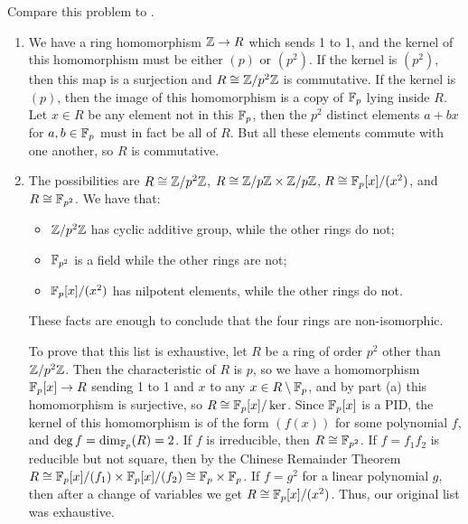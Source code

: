 \begin{solution}
Compare this problem to .
\begin{enumerate}
    \item We have a ring homomorphism $\mathbb{Z} \to R$ which sends 1 to 1, and the kernel of this homomorphism must be either $(p)$ or $(p^2)$. If the kernel is $(p^2)$, then this map is a surjection and $R \cong \mathbb{Z}/p^2\mathbb{Z}$ is commutative. If the kernel is $(p)$, then the image of this homomorphism is a copy of $\mathbb{F}_p$ lying inside $R$. Let $x \in R$ be any element not in this $\mathbb{F}_p$, then the $p^2$ distinct elements $a + bx$ for $a,b \in \mathbb{F}_p$ must in fact be all of $R$. But all these elements commute with one another, so $R$ is commutative.
    \item The possibilities are $R \cong \mathbb{Z}/p^2 \mathbb{Z}$, $R \cong \mathbb{Z}/p\mathbb{Z} \times \mathbb{Z}/p\mathbb{Z}$, $R \cong \mathbb{F}_p[x]/(x^2)$, and $R \cong \mathbb{F}_{p^2}$. We have that:
    \begin{itemize}
        \item $\mathbb{Z}/p^2\mathbb{Z}$ has cyclic additive group, while the other rings do not;
        \item $\mathbb{F}_{p^2}$ is a field while the other rings are not;
        \item $\mathbb{F}_p[x]/(x^2)$ has nilpotent elements, while the other rings do not.
    \end{itemize}
    These facts are enough to conclude that the four rings are non-isomorphic.

    To prove that this list is exhaustive, let $R$ be a ring of order $p^2$ other than $\mathbb{Z}/p^2\mathbb{Z}$. Then the characteristic of $R$ is $p$, so we have a homomorphism $\mathbb{F}_p[x] \to R$ sending 1 to 1 and $x$ to any $x \in R \setminus \mathbb{F}_p$, and by part (a) this homomorphism is surjective, so $R \cong \mathbb{F}_p[x]/\ker$. Since $\mathbb{F}_p[x]$ is a PID, the kernel of this homomorphism is of the form $(f(x))$ for some polynomial $f$, and $\deg f = \dim_{\mathbb{F}_p}(R) = 2$. If $f$ is irreducible, then $R \cong \mathbb{F}_{p^2}$. If $f = f_1 f_2$ is reducible but not square, then by the Chinese Remainder Theorem $R \cong \mathbb{F}_p[x]/(f_1) \times \mathbb{F}_p[x]/(f_2) \cong \mathbb{F}_p \times \mathbb{F}_p$. If $f = g^2$ for a linear polynomial $g$, then after a change of variables we get $R \cong \mathbb{F}_p[x]/(x^2)$. Thus, our original list was exhaustive.
\end{enumerate}
\end{solution}

